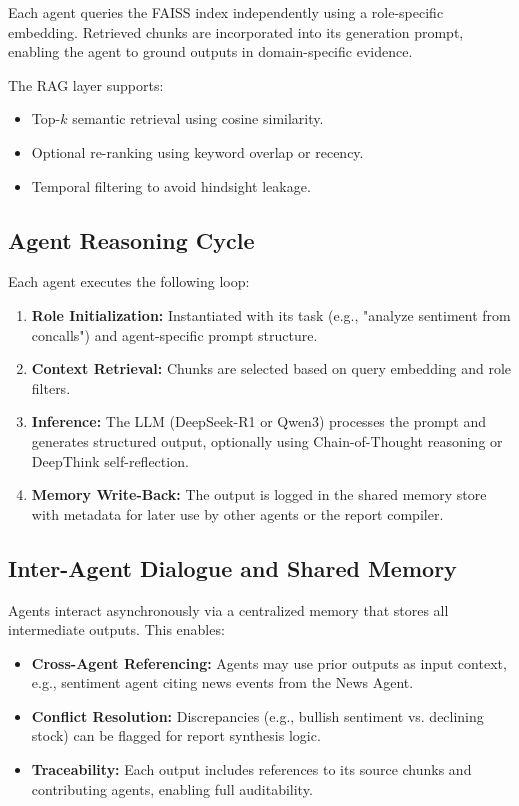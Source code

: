 \documentclass[11pt]{article}
\begin{document}
Each agent queries the FAISS index independently using a role-specific embedding. Retrieved chunks are incorporated into its generation prompt, enabling the agent to ground outputs in domain-specific evidence.

The RAG layer supports:
\begin{itemize}
    \item Top-$k$ semantic retrieval using cosine similarity.
    \item Optional re-ranking using keyword overlap or recency.
    \item Temporal filtering to avoid hindsight leakage.
\end{itemize}

\subsection*{Agent Reasoning Cycle}

Each agent executes the following loop:

\begin{enumerate}
    \item \textbf{Role Initialization:} Instantiated with its task (e.g., "analyze sentiment from concalls") and agent-specific prompt structure.
    \item \textbf{Context Retrieval:} Chunks are selected based on query embedding and role filters.
    \item \textbf{Inference:} The LLM (DeepSeek-R1 or Qwen3) processes the prompt and generates structured output, optionally using Chain-of-Thought reasoning or DeepThink self-reflection.
    \item \textbf{Memory Write-Back:} The output is logged in the shared memory store with metadata for later use by other agents or the report compiler.
\end{enumerate}

\subsection*{Inter-Agent Dialogue and Shared Memory}

Agents interact asynchronously via a centralized memory that stores all intermediate outputs. This enables:

\begin{itemize}
    \item \textbf{Cross-Agent Referencing:} Agents may use prior outputs as input context, e.g., sentiment agent citing news events from the News Agent.
    \item \textbf{Conflict Resolution:} Discrepancies (e.g., bullish sentiment vs. declining stock) can be flagged for report synthesis logic.
    \item \textbf{Traceability:} Each output includes references to its source chunks and contributing agents, enabling full auditability.
\end{itemize}
\end{document}
